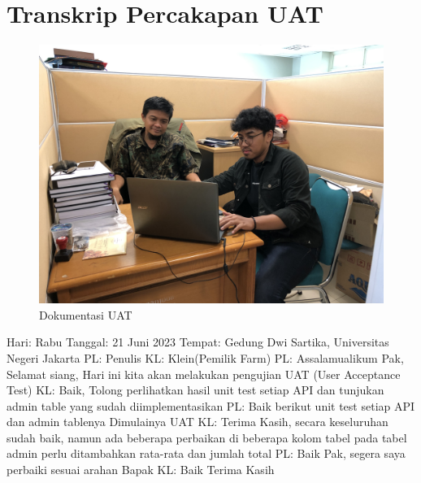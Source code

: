 
\section {Transkrip Percakapan UAT}
\begin{figure}[H]
	\centering
	\includegraphics[width=1\textwidth]{gambar/img_uat.JPG}
	\caption{Dokumentasi UAT}
	\label{fig:img_uat}
\end{figure}
\begin{flushleft}
Hari: Rabu
\linebreak
Tanggal: 21 Juni 2023
\linebreak
Tempat: Gedung Dwi Sartika, Universitas Negeri Jakarta
\linebreak
PL: Penulis
\linebreak
KL: Klein(Pemilik Farm)
\linebreak
\linebreak
PL: Assalamualikum Pak, Selamat siang, Hari ini kita akan melakukan pengujian UAT (User Acceptance Test)
\linebreak
KL: Baik, Tolong perlihatkan hasil unit test setiap API dan tunjukan admin table yang sudah diimplementasikan
\linebreak
PL: Baik berikut unit test setiap API dan admin tablenya
\linebreak
Dimulainya UAT
\linebreak
KL: Terima Kasih, secara keseluruhan sudah baik, namun ada beberapa perbaikan di beberapa kolom tabel pada tabel admin perlu ditambahkan rata-rata dan jumlah total
\linebreak
PL: Baik Pak, segera saya perbaiki sesuai arahan Bapak
\linebreak
KL: Baik Terima Kasih
\end{flushleft}